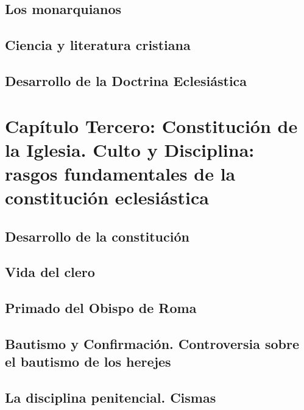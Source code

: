 \raggedbottom{} \documentclass[12pt]{book}
\begin{document}
\section{Los monarquianos}
\section{Ciencia y literatura cristiana}
\section{Desarrollo de la Doctrina Eclesiástica}
\chapter{Capítulo Tercero: Constitución de la Iglesia. Culto y Disciplina: rasgos fundamentales de la constitución eclesiástica}
\section{Desarrollo de la constitución}
\section{Vida del clero}
\section{Primado del Obispo de Roma}
\section{Bautismo y Confirmación. Controversia sobre el bautismo de los herejes}
\section{La disciplina penitencial. Cismas}
\end{document}
